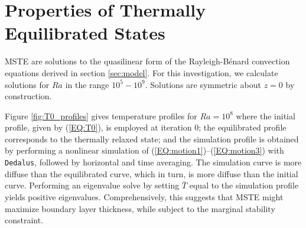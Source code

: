 \documentclass[reprint,amsmath,amssymb,aps]{revtex4-1}
\begin{document}
\section{Properties of Thermally Equilibrated States}\label{sec:properties}
MSTE are solutions to the quasilinear form of the Rayleigh-B\'enard convection equations derived in section \ref{sec:model}. 
For this investigation, we calculate solutions for $Ra$ in the range $10^5 - 10^9$. 
Solutions are symmetric about $z = 0$ by construction. 

Figure \ref{fig:T0_profiles} gives temperature profiles for $Ra = 10^8$ where the initial profile, given by (\ref{EQ:T0}), is employed at iteration 0; the equilibrated profile corresponds to the thermally relaxed state; and the simulation profile is obtained by performing a nonlinear simulation of (\ref{EQ:motion1})--(\ref{EQ:motion3}) with \texttt{Dedalus}, followed by horizontal and time averaging. 
The simulation curve is more diffuse than the equilibrated curve, which in turn, is more diffuse than the initial curve. 
Performing an eigenvalue solve by setting $\bar{T}$ equal to the simulation profile yields positive eigenvalues. 
Comprehensively, this suggests that MSTE might maximize boundary layer thickness, while subject to the marginal stability constraint.
\end{document}
